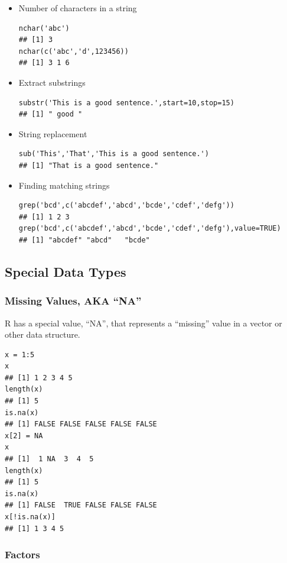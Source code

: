 \documentclass[]{article}
\theoremstyle{definition}
\theoremstyle{definition}
\theoremstyle{remark}
\begin{document}
\begin{itemize}
\item
  {Number of characters in a string}

\begin{verbatim}
nchar('abc')
## [1] 3
nchar(c('abc','d',123456))
## [1] 3 1 6
\end{verbatim}
\item
  {Extract substrings}

\begin{verbatim}
substr('This is a good sentence.',start=10,stop=15)
## [1] " good "
\end{verbatim}
\item
  {String replacement}

\begin{verbatim}
sub('This','That','This is a good sentence.')
## [1] "That is a good sentence."
\end{verbatim}
\item
  {Finding matching strings}

\begin{verbatim}
grep('bcd',c('abcdef','abcd','bcde','cdef','defg'))
## [1] 1 2 3
grep('bcd',c('abcdef','abcd','bcde','cdef','defg'),value=TRUE)
## [1] "abcdef" "abcd"   "bcde"
\end{verbatim}
\end{itemize}

\subsection{Special Data Types}\label{special-data-types}

\subsubsection{\texorpdfstring{Missing Values, AKA
``NA''}{Missing Values, AKA NA}}\label{missing-values-aka-na}

R has a special value, ``NA'', that represents a ``missing'' value in a
vector or other data structure.

\begin{verbatim}
x = 1:5
x
## [1] 1 2 3 4 5
length(x)
## [1] 5
is.na(x)
## [1] FALSE FALSE FALSE FALSE FALSE
x[2] = NA
x
## [1]  1 NA  3  4  5
length(x)
## [1] 5
is.na(x)
## [1] FALSE  TRUE FALSE FALSE FALSE
x[!is.na(x)]
## [1] 1 3 4 5
\end{verbatim}

\subsubsection{Factors}\label{factors}
\end{document}
